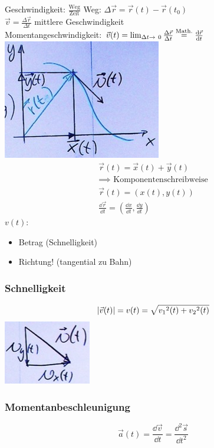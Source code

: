Geschwindigkeit: $\frac{\text{Weg}}{\text{Zeit}}$
Weg: $\Delta \vec{r} = \vec{r}(t) - \vec{r}(t_0)$ \\
$\vec{v} = \frac{\Delta \vec{r}}{\Delta t}$ mittlere Geschwindigkeit \\
Momentangeschwindigkeit: $\vec{v}(t) = \lim_{\Delta t \rightarrow 0} \frac{\Delta \vec{r}}{\Delta t} \overset{\text{\scriptsize{Math.}}}{=} \frac{\dd \vec{r}}{\dd t}$ \\
\includegraphics{Bild14}
\begin{gather*}
	\vec{r}(t) = \vec{x}(t) + \vec{y}(t) \\
	\implies \text{ Komponentenschreibweise} \\
	\vec{r}(t) = ( x(t) , y(t) ) \\
	\frac{\dd \vec{r}}{\dd t} = \left( \frac{\dd x}{\dd t} , \frac{\dd y}{\dd t} \right)
\end{gather*}
$v(t)$:
\begin{itemize}
	\item Betrag (Schnelligkeit)
	\item Richtung! (tangential zu Bahn)
\end{itemize}
\subsubsection{Schnelligkeit}
\[ \abs{\vec{v}(t)} = v(t) = \sqrt{{v_1}^2(t) + {v_2}^2(t)} \]
\includegraphics{Bild15}

\subsubsection{Momentanbeschleunigung}
\[ \vec{a}(t) = \frac{\dd \vec{v}}{\dd t} = \frac{\dd^2 \vec{s}}{\dd t^2} \]

